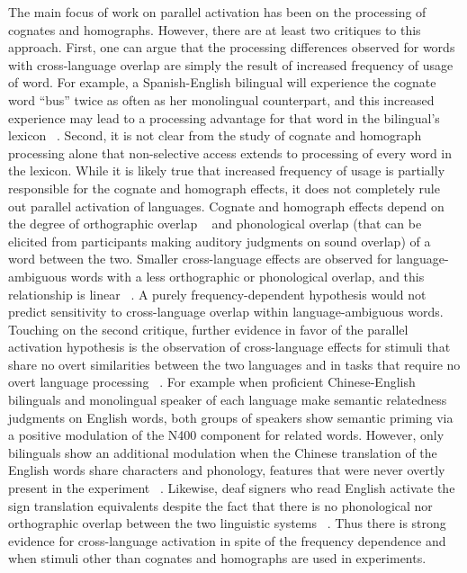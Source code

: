 The main focus of work on parallel activation has been on the processing of cognates and homographs. However, there are at least two critiques to this approach. First, one can argue that the processing differences observed for words with cross-language overlap are simply the result of increased frequency of usage of word. For example, a Spanish-English bilingual will experience the cognate word ``bus'' twice as often as her monolingual counterpart, and this increased experience may lead to a processing advantage for that word in the bilingual's lexicon ~\citep[see e.g. the weaker-links or frequency lag hypotheses,][]{Gollan2008, Gollan2011a}. Second, it is not clear from the study of cognate and homograph processing alone that non-selective access extends to processing of every word in the lexicon. While it is likely true that increased frequency of usage is partially responsible for the cognate and homograph effects, it does not completely rule out parallel activation of languages. Cognate and homograph effects depend on the degree of orthographic overlap ~\citep[e.g., which can be calculated via the Van Orden or Levenshtein distance methods,][]{Levenshtein1966, VanOrden1987} and phonological overlap (that can be elicited from participants making auditory judgments on sound overlap) of a word between the two. Smaller cross-language effects are observed for language-ambiguous words with a less orthographic or phonological overlap, and this relationship is linear ~\citep[e.g.,][]{Dijkstra1999, Schwartz2007, VanAssche2010}. A purely frequency-dependent hypothesis would not predict sensitivity to cross-language overlap within language-ambiguous words. Touching on the second critique, further evidence in favor of the parallel activation hypothesis is the observation of cross-language effects for stimuli that share no overt similarities between the two languages and in tasks that require no overt language processing ~\citep{Chabalpress, Morford2011, Thierry2007, Wu2013}. For example when proficient Chinese-English bilinguals and monolingual speaker of each language make semantic relatedness judgments on English words, both groups of speakers show semantic priming via a positive modulation of the N400 component for related words. However, only bilinguals show an additional modulation when the Chinese translation of the English words share characters and phonology, features that were never overtly present in the experiment ~\citep{Thierry2007, Wu2010}. Likewise, deaf signers who read English activate the sign translation equivalents despite the fact that there is no phonological nor orthographic overlap between the two linguistic systems ~\citep{Morford2011}. Thus there is strong evidence for cross-language activation in spite of the frequency dependence and when stimuli other than cognates and homographs are used in experiments. 

